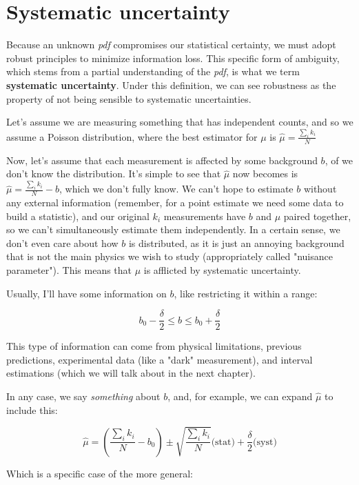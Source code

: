 \section{Systematic uncertainty}

Because an unknown \emph{pdf} compromises our statistical certainty, we must adopt robust principles to minimize information loss. This specific form of ambiguity, which stems from a partial understanding of the \emph{pdf}, is what we term \textbf{systematic uncertainty}. Under this definition, we can see robustness as the property of not being sensible to systematic uncertainties. 

Let's assume we are measuring something that has independent counts, and so we assume a Poisson distribution, where the best estimator for $\mu$ is $\hat\mu = \frac{\sum_i k_i}{N}$ 

Now, let's assume that each measurement is affected by some background $b$, of we don't know the distribution. It's simple to see that $\hat\mu$ now becomes is $\hat\mu = \frac{\sum_i k_i}{N}-b$, which we don't fully know. We can't hope to estimate $b$ without any external information (remember, for a point estimate we need some data to build a statistic), and our original $k_i$ measurements have $b$ and $\mu$ paired together, so we can't simultaneously estimate them independently. In a certain sense, we don't even care about how $b$ is distributed, as it is just an annoying background that is not the main physics we wish to study (appropriately called "nuisance parameter"). This means that $\mu$ is afflicted by systematic uncertainty. 

Usually, I'll have some information on $b$, like restricting it within a range:

	\[
	b_0 - \frac{\delta}{2} \leq b \leq b_0 + \frac{\delta}{2}
	\]

This type of information can come from physical limitations, previous predictions, experimental data (like a "dark" measurement), and interval estimations (which we will talk about in the next chapter). 

In any case, we say \emph{something} about $b$, and, for example, we can expand $\hat\mu$ to include this:

	\[
	\hat\mu = \left(\frac{\sum_i k_i}{N}-b_0\right)\pm \sqrt{\frac{\sum_i k_i}{N}}\text{(stat)} + \frac{\delta}{2}\text{(syst)} 
	\]

Which is a specific case of the more general:

